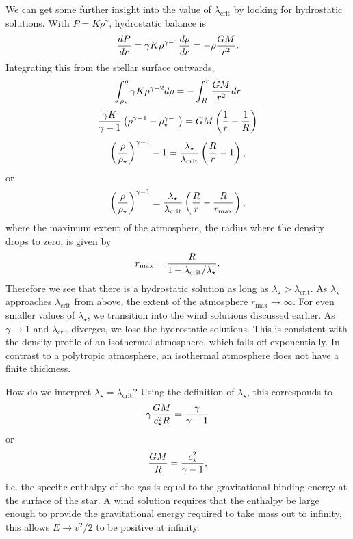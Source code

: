 \documentclass[preprint,12pt]{aastex}
\begin{document}
We can get some further insight into the value of $\lambda_\mathrm{crit}$ by looking for hydrostatic solutions. With $P=K\rho^\gamma$, hydrostatic balance is  
\begin{equation}
{dP\over dr} = \gamma K \rho^{\gamma-1} {d\rho\over dr} = -\rho {GM\over r^2}.
\end{equation}
Integrating this from the stellar surface outwards,
\begin{equation}
\int_{\rho_\star}^\rho \gamma K \rho^{\gamma-2} d\rho = - \int_R^r {GM\over r^2} dr
\end{equation}
\begin{equation}
{\gamma K\over \gamma-1}\left(\rho^{\gamma-1}-\rho_\star^{\gamma-1}\right) = GM \left({1\over r} - {1\over R}\right)
\end{equation}
\begin{equation}
\left({\rho\over \rho_\star}\right)^{\gamma-1}-1 = {\lambda_\star\over \lambda_\mathrm{crit}} \left({R\over r} -1\right),
\end{equation}
or 
\begin{equation}
\left({\rho\over\rho_\star}\right)^{\gamma-1} = {\lambda_\star\over \lambda_\mathrm{crit}}\left({R\over r}-{R\over r_\mathrm{max}}\right),
\end{equation}
where the maximum extent of the atmosphere, the radius where the density drops to zero, is given by
\begin{equation}
r_\mathrm{max} = {R\over 1-\lambda_\mathrm{crit}/\lambda_\star}.
\end{equation}
Therefore we see that there is a hydrostatic solution as long as $\lambda_\star > \lambda_\mathrm{crit}$. As $\lambda_\star$ approaches $\lambda_\mathrm{crit}$ from above, the extent of the atmosphere $r_\mathrm{max}\rightarrow \infty$. For even smaller values of $\lambda_\star$, we transition into the wind solutions discussed earlier. As $\gamma\rightarrow 1$ and $\lambda_\mathrm{crit}$ diverges, we lose the hydrostatic solutions. This is consistent with the density profile of an isothermal atmosphere, which falls off exponentially. In contrast to a polytropic atmosphere, an isothermal atmosphere does not have a finite thickness. 

How do we interpret $\lambda_\star = \lambda_\mathrm{crit}$? Using the definition of $\lambda_\star$, this corresponds to
\begin{equation}
\gamma {GM\over c_\star^2 R} = {\gamma\over \gamma-1}
\end{equation}
or 
\begin{equation}
{GM\over R} = {c_\star^2\over \gamma-1},
\end{equation}
i.e. the specific enthalpy of the gas is equal to the gravitational binding energy at the surface of the star. A wind solution requires that the enthalpy be large enough to provide the gravitational energy required to take mass out to infinity, this allows $E\rightarrow v^2/2$ to be positive at infinity.
\end{document}
